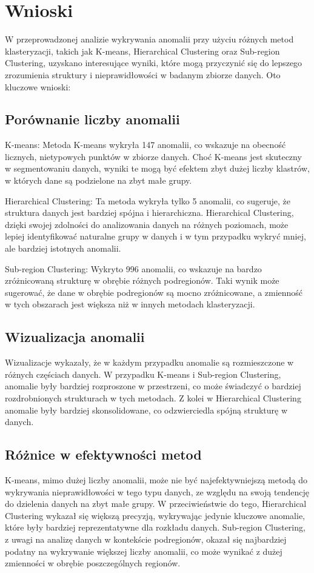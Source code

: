 \documentclass[a4paper,fleqn]{cas-dc}
\begin{document}
\section{Wnioski}
W przeprowadzonej analizie wykrywania anomalii przy użyciu różnych metod klasteryzacji, takich jak K-means, Hierarchical Clustering oraz Sub-region Clustering, uzyskano interesujące wyniki, które mogą przyczynić się do lepszego zrozumienia struktury i nieprawidłowości w badanym zbiorze danych. Oto kluczowe wnioski:
\subsection{Porównanie liczby anomalii}
K-means: Metoda K-means wykryła 147 anomalii, co wskazuje na obecność licznych, nietypowych punktów w zbiorze danych. Choć K-means jest skuteczny w segmentowaniu danych, wyniki te mogą być efektem zbyt dużej liczby klastrów, w których dane są podzielone na zbyt małe grupy.

Hierarchical Clustering: Ta metoda wykryła tylko 5 anomalii, co sugeruje, że struktura danych jest bardziej spójna i hierarchiczna. Hierarchical Clustering, dzięki swojej zdolności do analizowania danych na różnych poziomach, może lepiej identyfikować naturalne grupy w danych i w tym przypadku wykryć mniej, ale bardziej istotnych anomalii.

Sub-region Clustering: Wykryto 996 anomalii, co wskazuje na bardzo zróżnicowaną strukturę w obrębie różnych podregionów. Taki wynik może sugerować, że dane w obrębie podregionów są mocno zróżnicowane, a zmienność w tych obszarach jest większa niż w innych metodach klasteryzacji.
\subsection{Wizualizacja anomalii}
Wizualizacje wykazały, że w każdym przypadku anomalie są rozmieszczone w różnych częściach danych. W przypadku K-means i Sub-region Clustering, anomalie były bardziej rozproszone w przestrzeni, co może świadczyć o bardziej rozdrobnionych strukturach w tych metodach. Z kolei w Hierarchical Clustering anomalie były bardziej skonsolidowane, co odzwierciedla spójną strukturę w danych.
\subsection{Różnice w efektywności metod}
K-means, mimo dużej liczby anomalii, może nie być najefektywniejszą metodą do wykrywania nieprawidłowości w tego typu danych, ze względu na swoją tendencję do dzielenia danych na zbyt małe grupy. W przeciwieństwie do tego, Hierarchical Clustering wykazał się większą precyzją, wykrywając jedynie kluczowe anomalie, które były bardziej reprezentatywne dla rozkładu danych.
Sub-region Clustering, z uwagi na analizę danych w kontekście podregionów, okazał się najbardziej podatny na wykrywanie większej liczby anomalii, co może wynikać z dużej zmienności w obrębie poszczególnych regionów.
\end{document}

